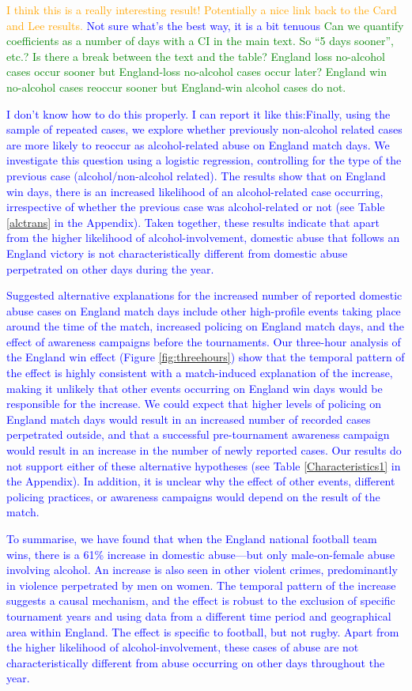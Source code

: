 \documentclass[12pt, letterpaper]{article}
\newcommand{\NS}[1] {{\textcolor{green}{#1}}}
\newcommand{\TM}[1] {{\textcolor{orange}{#1}}}
\newcommand{\AT}[1] {{\textcolor{blue}{#1}}}
\begin{document}
 \TM{I think this is a really interesting result! Potentially a nice link back to the Card and Lee results.} \AT{Not sure what's the best way, it is a bit tenuous} \NS{Can we quantify coefficients as a number of days with a CI in the main text. So ``5 days sooner'', etc.? }\NS{Is there a break between the text and the table? England loss no-alcohol cases occur sooner but England-loss no-alcohol cases occur later? England win no-alcohol cases reoccur sooner but England-win alcohol cases do not.} \AT{I don't know how to do this properly. I can report it like this:Finally, using the sample of repeated cases, we explore whether previously non-alcohol related cases are more likely to reoccur as alcohol-related abuse on England match days. We investigate this question using a logistic regression, controlling for the type of the previous case (alcohol/non-alcohol related). The results show that on England win days, there is an increased likelihood of an alcohol-related case occurring, irrespective of whether the previous case was alcohol-related or not (see Table \ref{alctrans} in the Appendix). Taken together, these results indicate that apart from the higher likelihood of alcohol-involvement, domestic abuse that follows an England victory is not characteristically different from domestic abuse perpetrated on other days during the year. 

Suggested alternative explanations for the increased number of reported domestic abuse cases on England match days include other high-profile events taking place around the time of the match, increased policing on England match days, and the effect of awareness campaigns before the tournaments\autocite{Brooks-Hay2018}. Our three-hour analysis of the England win effect (Figure \ref{fig:threehours}) show that the temporal pattern of the effect is highly consistent with a match-induced explanation of the increase, making it unlikely that other events occurring on England win days would be responsible for the increase. We could expect that higher levels of policing on England match days would result in an increased number of recorded cases perpetrated outside, and that a successful pre-tournament awareness campaign would result in an increase in the number of newly reported cases. Our results do not support either of these alternative hypotheses (see Table \ref{Characteristics1} in the Appendix). In addition, it is unclear why the effect of other events, different policing practices, or awareness campaigns would depend on the result of the match. 


To summarise, we have found that when the England national football team wins, there is a 61\% increase in domestic abuse---but only male-on-female abuse involving alcohol. An increase is also seen in other violent crimes, predominantly in violence perpetrated by men on women. The temporal pattern of the increase suggests a causal mechanism, and the effect is robust to the exclusion of specific tournament years and using data from a different time period and geographical area within England. The effect is specific to football, but not rugby. Apart from the higher likelihood of alcohol-involvement, these cases of abuse are not characteristically different from abuse occurring on other days throughout the year. 

}
\end{document}
